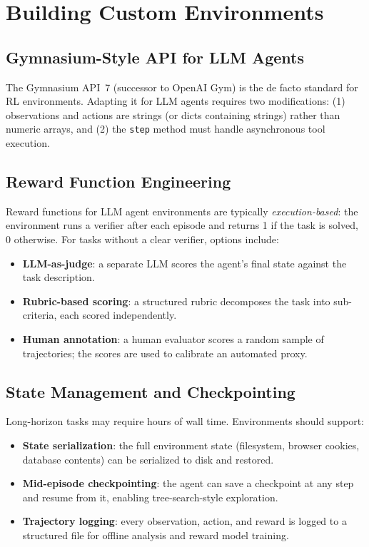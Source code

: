 \section{Building Custom Environments}
\label{sec:custom-env}

\subsection{Gymnasium-Style API for LLM Agents}
\label{gymnasium-style-api-for-llm-agents}

The Gymnasium API~\cite{towers2024gymnasium}7 (successor to OpenAI Gym) is the de facto standard for RL environments. Adapting it for LLM agents requires two modifications: (1) observations and actions are strings (or dicts containing strings) rather than numeric arrays, and (2) the \texttt{step} method must handle asynchronous tool execution.

\subsection{Reward Function Engineering}
\label{reward-function-engineering}

Reward functions for LLM agent environments are typically \emph{execution-based}: the environment runs a verifier after each episode and returns 1 if the task is solved, 0 otherwise. For tasks without a clear verifier, options include:

\begin{itemize}
  \item \textbf{LLM-as-judge}: a separate LLM scores the agent’s final state against the task description.
  \item \textbf{Rubric-based scoring}: a structured rubric decomposes the task into sub-criteria, each scored independently.
  \item \textbf{Human annotation}: a human evaluator scores a random sample of trajectories; the scores are used to calibrate an automated proxy.
\end{itemize}

\subsection{State Management and Checkpointing}
\label{state-management-and-checkpointing}

Long-horizon tasks may require hours of wall time. Environments should support:

\begin{itemize}
  \item \textbf{State serialization}: the full environment state (filesystem, browser cookies, database contents) can be serialized to disk and restored.
  \item \textbf{Mid-episode checkpointing}: the agent can save a checkpoint at any step and resume from it, enabling tree-search-style exploration.
  \item \textbf{Trajectory logging}: every observation, action, and reward is logged to a structured file for offline analysis and reward model training.
\end{itemize}

